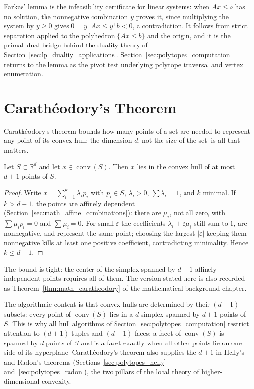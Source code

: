 Farkas' lemma \cite{farkas1902} is the infeasibility certificate for linear
systems: when $Ax \le b$ has no solution, the nonnegative combination $y$
proves it, since multiplying the system by $y \ge 0$ gives
$0 = y^{\top} A x \le y^{\top} b < 0$, a contradiction. It follows from
strict separation applied to the polyhedron $\{Ax \le b\}$ and the origin,
and it is the primal--dual bridge behind the duality theory of
Section~\ref{sec:lp_duality_applications}. Section~\ref{sec:polytopes_computation}
returns to the lemma as the pivot test underlying polytope traversal and
vertex enumeration.


\section{Carath\'eodory's Theorem}
\label{sec:polytopes_caratheodory}

Carath\'eodory's theorem bounds how many points of a set are needed to
represent any point of its convex hull: the dimension $d$, not the size of
the set, is all that matters.

\begin{theorem}\label{thm:polytopes_caratheodory}
  Let $S \subset \mathbb{R}^d$ and let $x \in \operatorname{conv}(S)$. Then
  $x$ lies in the convex hull of at most $d + 1$ points of $S$.
\end{theorem}

\begin{proof}
  Write $x = \sum_{i=1}^{k} \lambda_i p_i$ with $p_i \in S$, $\lambda_i > 0$,
  $\sum \lambda_i = 1$, and $k$ minimal. If $k > d + 1$, the points are
  affinely dependent (Section~\ref{sec:math_affine_combinations}): there are
  $\mu_i$, not all zero, with $\sum \mu_i p_i = 0$ and $\sum \mu_i = 0$. For
  small $\varepsilon$ the coefficients $\lambda_i + \varepsilon \mu_i$ still
  sum to $1$, are nonnegative, and represent the same point; choosing the
  largest $|\varepsilon|$ keeping them nonnegative kills at least one
  positive coefficient, contradicting minimality. Hence $k \le d + 1$.
\end{proof}

The bound is tight: the center of the simplex spanned by $d+1$ affinely
independent points requires all of them. The version stated here is also
recorded as Theorem~\ref{thm:math_caratheodory} of the mathematical
background chapter.

The algorithmic content is that convex hulls are determined by their
$(d+1)$-subsets: every point of $\operatorname{conv}(S)$ lies in a
$d$-simplex spanned by $d+1$ points of $S$. This is why all hull algorithms
of Section~\ref{sec:polytopes_computation} restrict attention to
$(d+1)$-tuples and $(d-1)$-faces: a facet of $\operatorname{conv}(S)$ is
spanned by $d$ points of $S$ and is a facet exactly when all other points
lie on one side of its hyperplane. Carath\'eodory's theorem also supplies
the $d+1$ in Helly's and Radon's theorems
(Sections~\ref{sec:polytopes_helly} and~\ref{sec:polytopes_radon}), the two
pillars of the local theory of higher-dimensional convexity.

